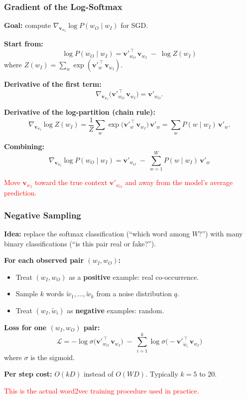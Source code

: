 \documentclass[notes,11pt, aspectratio=169]{beamer}
\newcommand{\vv}{\mathbf{v}}
\begin{document}
\begin{frame}
\frametitle{Gradient of the Log-Softmax}

\textbf{Goal:} compute $\nabla_{\vv_{w_I}} \log P(w_O \mid w_I)$ for SGD.

\vspace{6pt}
\textbf{Start from:}
\[
    \log P(w_O \mid w_I)
    = \vv'^{\,\top}_{w_O}\, \vv_{w_I} \;-\; \log Z(w_I)
\]
where $Z(w_I) = \sum_w \exp(\vv'^{\,\top}_w\, \vv_{w_I})$.

\vspace{6pt}
\textbf{Derivative of the first term:}
\[
    \nabla_{\vv_{w_I}} \bigl(\vv'^{\,\top}_{w_O}\, \vv_{w_I}\bigr) = \vv'_{w_O}.
\]

\textbf{Derivative of the log-partition (chain rule):}
\[
    \nabla_{\vv_{w_I}} \log Z(w_I)
    = \frac{1}{Z} \sum_w \exp\!\bigl(\vv'^{\,\top}_w\, \vv_{w_I}\bigr)\, \vv'_w
    = \sum_w P(w \mid w_I)\, \vv'_w.
\]

\textbf{Combining:}
\[
    \boxed{\;\nabla_{\vv_{w_I}} \log P(w_O \mid w_I)
    = \vv'_{w_O} \;-\; \sum_{w=1}^W P(w \mid w_I)\, \vv'_w\;}
\]

\vspace{4pt}
\textcolor{red}{Move $\vv_{w_I}$ toward the true context $\vv'_{w_O}$ and away from the model's average prediction.}
\end{frame}

\begin{frame}
\frametitle{Negative Sampling}

\textbf{Idea:} replace the softmax classification (``which word among $W$?'') with many binary classifications (``is this pair real or fake?'').

\vspace{8pt}
\textbf{For each observed pair $(w_I, w_O)$:}
\begin{itemize}
    \item Treat $(w_I, w_O)$ as a \textbf{positive} example: real co-occurrence.
    \item Sample $k$ words $\tilde w_1, \ldots, \tilde w_k$ from a noise distribution $q$.
    \item Treat $(w_I, \tilde w_i)$ as \textbf{negative} examples: random.
\end{itemize}

\vspace{8pt}
\textbf{Loss for one $(w_I, w_O)$ pair:}
\[
    \mathcal{L} = -\log \sigma\!\bigl(\vv'^{\,\top}_{w_O}\, \vv_{w_I}\bigr)
        \;-\; \sum_{i=1}^k \log \sigma\!\bigl(-\vv'^{\,\top}_{\tilde w_i}\, \vv_{w_I}\bigr)
\]
where $\sigma$ is the sigmoid.

\vspace{4pt}
\textbf{Per step cost:} $O(k D)$ instead of $O(W D)$. Typically $k = 5$ to $20$.

\vspace{4pt}
\textcolor{red}{This is the actual word2vec training procedure used in practice.}
\end{frame}
\end{document}
